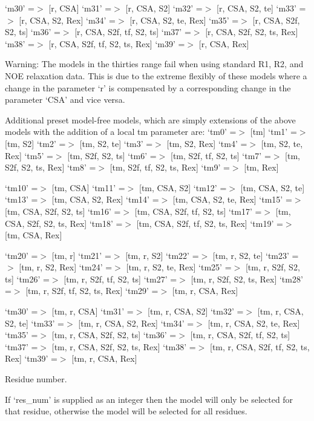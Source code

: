     `m30'   =$>$ [r, CSA]
    `m31'   =$>$ [r, CSA, S2]
    `m32'   =$>$ [r, CSA, S2, te]
    `m33'   =$>$ [r, CSA, S2, Rex]
    `m34'   =$>$ [r, CSA, S2, te, Rex]
    `m35'   =$>$ [r, CSA, S2f, S2, ts]
    `m36'   =$>$ [r, CSA, S2f, tf, S2, ts]
    `m37'   =$>$ [r, CSA, S2f, S2, ts, Rex]
    `m38'   =$>$ [r, CSA, S2f, tf, S2, ts, Rex]
    `m39'   =$>$ [r, CSA, Rex]

Warning:  The models in the thirties range fail when using standard R1, R2, and NOE
relaxation data.  This is due to the extreme flexibly of these models where a change in the
parameter `r' is compensated by a corresponding change in the parameter `CSA' and
vice versa.


Additional preset model-free models, which are simply extensions of the above models with
the addition of a local tm parameter are:
    `tm0'   =$>$ [tm]
    `tm1'   =$>$ [tm, S2]
    `tm2'   =$>$ [tm, S2, te]
    `tm3'   =$>$ [tm, S2, Rex]
    `tm4'   =$>$ [tm, S2, te, Rex]
    `tm5'   =$>$ [tm, S2f, S2, ts]
    `tm6'   =$>$ [tm, S2f, tf, S2, ts]
    `tm7'   =$>$ [tm, S2f, S2, ts, Rex]
    `tm8'   =$>$ [tm, S2f, tf, S2, ts, Rex]
    `tm9'   =$>$ [tm, Rex]

    `tm10'  =$>$ [tm, CSA]
    `tm11'  =$>$ [tm, CSA, S2]
    `tm12'  =$>$ [tm, CSA, S2, te]
    `tm13'  =$>$ [tm, CSA, S2, Rex]
    `tm14'  =$>$ [tm, CSA, S2, te, Rex]
    `tm15'  =$>$ [tm, CSA, S2f, S2, ts]
    `tm16'  =$>$ [tm, CSA, S2f, tf, S2, ts]
    `tm17'  =$>$ [tm, CSA, S2f, S2, ts, Rex]
    `tm18'  =$>$ [tm, CSA, S2f, tf, S2, ts, Rex]
    `tm19'  =$>$ [tm, CSA, Rex]

    `tm20'  =$>$ [tm, r]
    `tm21'  =$>$ [tm, r, S2]
    `tm22'  =$>$ [tm, r, S2, te]
    `tm23'  =$>$ [tm, r, S2, Rex]
    `tm24'  =$>$ [tm, r, S2, te, Rex]
    `tm25'  =$>$ [tm, r, S2f, S2, ts]
    `tm26'  =$>$ [tm, r, S2f, tf, S2, ts]
    `tm27'  =$>$ [tm, r, S2f, S2, ts, Rex]
    `tm28'  =$>$ [tm, r, S2f, tf, S2, ts, Rex]
    `tm29'  =$>$ [tm, r, CSA, Rex]

    `tm30'  =$>$ [tm, r, CSA]
    `tm31'  =$>$ [tm, r, CSA, S2]
    `tm32'  =$>$ [tm, r, CSA, S2, te]
    `tm33'  =$>$ [tm, r, CSA, S2, Rex]
    `tm34'  =$>$ [tm, r, CSA, S2, te, Rex]
    `tm35'  =$>$ [tm, r, CSA, S2f, S2, ts]
    `tm36'  =$>$ [tm, r, CSA, S2f, tf, S2, ts]
    `tm37'  =$>$ [tm, r, CSA, S2f, S2, ts, Rex]
    `tm38'  =$>$ [tm, r, CSA, S2f, tf, S2, ts, Rex]
    `tm39'  =$>$ [tm, r, CSA, Rex]



Residue number.

If `res\_num' is supplied as an integer then the model will only be selected for that
residue, otherwise the model will be selected for all residues.



